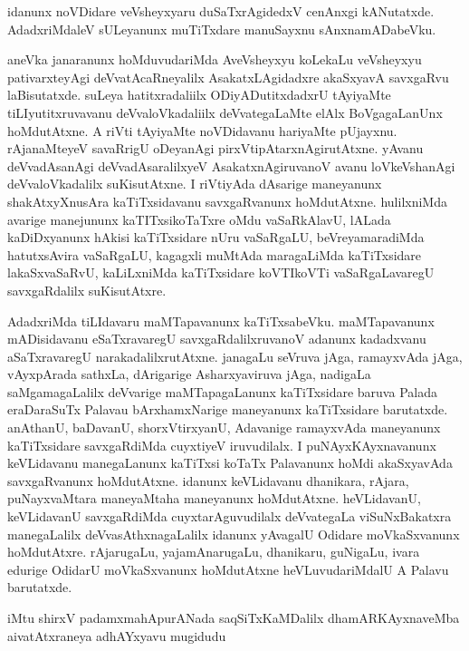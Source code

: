 \documentclass{article}
\begin{document}
\begin{mng}%
idanunx noVDidare veVsheyxyaru duSaTxrAgidedxV cenAnxgi kANutatxde. 
AdadxriMdaleV sULeyanunx muTiTxdare manuSayxnu sAnxnamADabeVku.
\end{mng}

\begin{mng}%
aneVka janaranunx hoMduvudariMda AveVsheyxyu koLekaLu veVsheyxyu 
pativarxteyAgi deVvatAcaRneyalilx AsakatxLAgidadxre akaSxyavA 
savxgaRvu laBisutatxde. suLeya hatitxradaliilx ODiyADutitxdadxrU 
tAyiyaMte tiLIyutitxruvavanu deVvaloVkadaliilx deVvategaLaMte elAlx 
BoVgagaLanUnx hoMdutAtxne. A riVti tAyiyaMte noVDidavanu hariyaMte 
pUjayxnu. rAjanaMteyeV savaRrigU oDeyanAgi pirxVtipAtarxnAgirutAtxne. 
yAvanu deVvadAsanAgi deVvadAsaralilxyeV AsakatxnAgiruvanoV avanu 
loVkeVshanAgi deVvaloVkadalilx suKisutAtxne. I riVtiyAda dAsarige 
maneyanunx shakAtxyXnusAra kaTiTxsidavanu savxgaRvanunx hoMdutAtxne. 
hulilxniMda avarige manejununx kaTITxsikoTaTxre oMdu vaSaRkAlavU, 
lALada kaDiDxyanunx hAkisi kaTiTxsidare nUru vaSaRgaLU, 
beVreyamaradiMda hatutxsAvira vaSaRgaLU, kagagxli muMtAda maragaLiMda 
kaTiTxsidare lakaSxvaSaRvU, kaLiLxniMda kaTiTxsidare koVTIkoVTi 
vaSaRgaLavaregU savxgaRdalilx suKisutAtxre.
\end{mng}

\begin{mng}%
AdadxriMda tiLIdavaru maMTapavanunx kaTiTxsabeVku. maMTapavanunx 
mADisidavanu eSaTxravaregU savxgaRdalilxruvanoV adanunx kadadxvanu 
aSaTxravaregU narakadalilxrutAtxne. janagaLu seVruva jAga, ramayxvAda 
jAga, vAyxpArada sathxLa, dArigarige Asharxyaviruva jAga, nadigaLa 
saMgamagaLalilx deVvarige maMTapagaLanunx kaTiTxsidare baruva Palada 
eraDaraSuTx Palavau bArxhamxNarige maneyanunx kaTiTxsidare barutatxde. 
anAthanU, baDavanU, shorxVtirxyanU, Adavanige ramayxvAda maneyanunx 
kaTiTxsidare savxgaRdiMda cuyxtiyeV iruvudilalx. I puNAyxKAyxnavanunx 
keVLidavanu manegaLanunx kaTiTxsi koTaTx Palavanunx hoMdi akaSxyavAda 
savxgaRvanunx hoMdutAtxne. idanunx keVLidavanu dhanikara, rAjara, 
puNayxvaMtara maneyaMtaha maneyanunx hoMdutAtxne. heVLidavanU, 
keVLidavanU savxgaRdiMda cuyxtarAguvudilalx deVvategaLa viSuNxBakatxra 
manegaLalilx deVvasAthxnagaLalilx idanunx yAvagalU Odidare 
moVkaSxvanunx hoMdutAtxre. rAjarugaLu, yajamAnarugaLu, dhanikaru, 
guNigaLu, ivara edurige OdidarU moVkaSxvanunx hoMdutAtxne 
heVLuvudariMdalU A Palavu barutatxde.
\end{mng}

\begin{center}
iMtu shirxV padamxmahApurANada saqSiTxKaMDalilx dhamARKAyxnaveMba\\
aivatAtxraneya adhAYxyavu mugidudu
\end{center}
\end{document}

